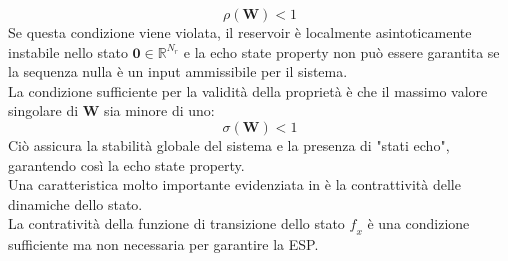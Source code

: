 \begin{equation}\label{raggiospettrale}
\rho(\mathbf{W})<1
\end{equation}
Se questa condizione viene violata, il reservoir è localmente asintoticamente instabile nello stato $\mathbf{0} \in \mathbb{R}^{N_r}$ e la echo state property non può essere garantita se la sequenza nulla è un input ammissibile per il sistema.\\
La condizione sufficiente per la validità della proprietà è che il massimo valore singolare di \textbf{W} sia minore di uno:
\begin{equation}\label{raggiospettrale2}
\sigma(\mathbf{W}) <1
\end{equation}
Ciò assicura la stabilità globale del sistema e la presenza di "stati echo", garantendo così la echo state property.\\
Una caratteristica molto importante evidenziata in \cite{Markovianfactor:paper}  è la contrattività delle dinamiche dello stato.\\
La contratività della funzione di transizione dello stato $\mathit{f_x}$ è una condizione sufficiente ma non necessaria per garantire la ESP.
